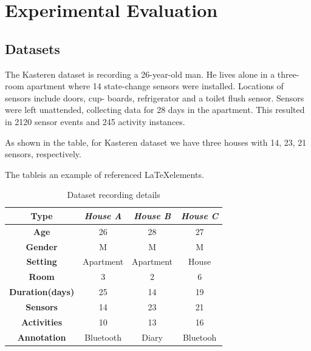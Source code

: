 \documentclass[11pt, oneside]{article}   	%
\begin{document}

\section{Experimental Evaluation}

\subsection{Datasets}

The Kasteren dataset is recording a 26-year-old man. He lives alone in a three-room apartment where 14 state-change sensors were installed. Locations of sensors include doors, cup- boards, refrigerator and a toilet flush sensor. Sensors were left unattended, collecting data for 28 days in the apartment. This resulted in 2120 sensor events and 245 activity instances.

As shown in the table, for Kasteren dataset we have three houses with 14, 23, 21 sensors, respectively.

The tableis an example of referenced \LaTeX elements.
 
\begin{table}[t!]
\small
\begin{center}
\begin{tabular}{||c|c|c|c|||}
\hline
\textbf{Type} & \emph{House A} & \emph{House B} & \emph{House C}\\ \hline
\textbf{Age} & 26 & 28 & 27\\ \hline
\textbf{Gender} & M & M & M\\ \hline
\textbf{Setting} & Apartment & Apartment & House\\ \hline
\textbf{Room} & 3 & 2 & 6\\ \hline
\textbf{Duration(days)} & 25 & 14 & 19\\ \hline
\textbf{Sensors} & 14 & 23 & 21\\ \hline
\textbf{Activities} & 10 & 13 & 16\\ \hline
\textbf{Annotation} & Bluetooth & Diary & Bluetooh\\ \hline
\end{tabular}
\end{center}
\caption{Dataset recording details}
\label{table:fake-attacks}
\vspace{-0.3cm}
\end{table}
\end{document}
